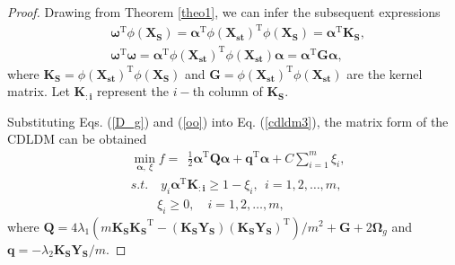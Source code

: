 \documentclass[a4paper]{cas-sc}
\begin{document}
\begin{proof}
Drawing from Theorem \ref{theo1}, we can infer the subsequent expressions
\begin{equation}\label{oo}
\begin{aligned}
&\boldsymbol{\omega}^{\mathrm{T}} \phi(\boldsymbol{X_S}) = \boldsymbol{\alpha}^{\mathrm{T}} \phi(\boldsymbol{X_{st}})^{\mathrm{T}} \phi(\boldsymbol{X_S})  =\boldsymbol{\alpha}^{\mathrm{T}} \boldsymbol{K_S} ,\\
&\boldsymbol{\omega}^{\mathrm{T}} \boldsymbol{\omega} = \boldsymbol{\alpha}^{\mathrm{T}} \phi(\boldsymbol{X_{st}})^{\mathrm{T}} \phi(\boldsymbol{X_{st}}) \boldsymbol{\alpha} = \boldsymbol{\alpha}^{\mathrm{T}} \boldsymbol{G} \boldsymbol{\alpha},
\end{aligned}
\end{equation}
where $\boldsymbol{K_S} = \phi(\boldsymbol{X_{st}})^{\mathrm{T}} \phi(\boldsymbol{X_S})$ and $\boldsymbol{G} =\phi(\boldsymbol{X_{st}})^{\mathrm{T}} \phi(\boldsymbol{X_{st}}) $ are the kernel matrix. Let $\boldsymbol{\boldsymbol{K_{:i}}}$ represent the $i-$th column of $\boldsymbol{K_S}$.

Substituting Eqs. (\ref{D_g}) and (\ref{oo}) into Eq. (\ref{cdldm3}), the matrix form of the CDLDM can be obtained
\begin{equation}
\begin{aligned}
\label{matrix}
&\mathop {\min }\limits_{\boldsymbol{\alpha},\ \xi } f = \ \ \frac{1}{2}{\boldsymbol{\alpha} ^{\mathrm{T}}}\boldsymbol{Q}\boldsymbol{\alpha}  + {\boldsymbol{q}^{\mathrm{T}}}\boldsymbol{\alpha}  + C \sum\limits_{i = 1}^m {{\xi _i}}, \\
& s.t.  \quad y_{i}\boldsymbol{\alpha}^{\mathrm{T}} \boldsymbol{\boldsymbol{K_{:i}}} \geq 1-\xi_{i}, \ \ i=1,2, \ldots, m,\\
&\ \quad\ \ \  \  \xi_{i} \geq 0,\quad i=1,2, \ldots, m,
\end{aligned}
\end{equation}
where ${\boldsymbol{Q}  = 4}{\lambda _1}(m \boldsymbol{K_S} {\boldsymbol{K_S}^{\mathrm{T}}} - (\boldsymbol{K_S} \boldsymbol{Y_S}){(\boldsymbol{K_S} \boldsymbol{Y_S})^{\mathrm{T}}})/{m^2} + \boldsymbol{G} +2 \boldsymbol{\Omega}_{g}$  and $\boldsymbol{q}= - {\lambda _2}\boldsymbol{K_S} \boldsymbol{Y_S}/m$. 


\end{proof}
\end{document}
